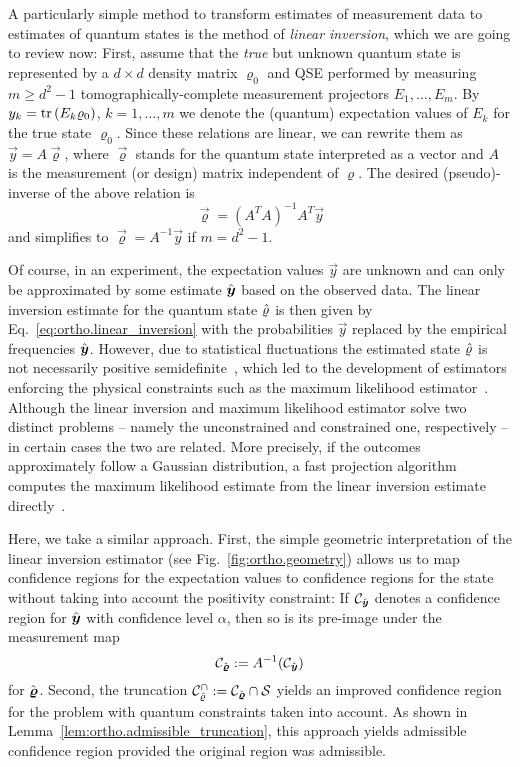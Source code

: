 A particularly simple method to transform estimates of measurement data to estimates of quantum states is the method of \emph{linear inversion}, which we are going to review now:
First, assume that the \emph{true} but unknown quantum state is represented by a $d\times d$ density matrix $\varrho_0$ and QSE performed by measuring $m\geq d^{2} - 1$ tomographically-complete measurement projectors $E_{1},\ldots,E_{m}$.
By $y_{k}=\operatorname{tr}\left(E_{k}\varrho_0\right)$, $k=1,\ldots,m$ we denote the (quantum) expectation values of $E_{k}$ for the true state $\varrho_0$.
Since these relations are linear, we can rewrite them as $\vec{y} = A \vec{\varrho}$, where $\vec{\varrho}$ stands for the quantum state interpreted as a vector and $A$ is the measurement (or design) matrix independent of $\varrho$.
The desired (pseudo)-inverse of the above relation is
\[
  \label{eq:ortho.linear_inversion}
  \vec{\varrho}={\left(A^{T}A\right)}^{-1}A^{T}\vec{y}
\]
and simplifies to $\vec{\varrho}=A^{-1}\vec{y}$ if $m=d^{2} - 1$.

Of course, in an experiment, the expectation values $\vec{y}$ are unknown and can only be approximated by some estimate $\hat{\boldsymbol{y}}$ based on the observed data.
The linear inversion estimate for the quantum state $\hat{\varrho}$ is then given by Eq.~\eqref{eq:ortho.linear_inversion} with the probabilities $\vec y$ replaced by the empirical frequencies $\hat{\boldsymbol{y}}$.
However, due to statistical fluctuations the estimated state $\hat{\varrho}$ is not necessarily positive semidefinite~\cite{Knips_2015_How}, which led to the development of estimators enforcing the physical constraints such as the maximum likelihood estimator~\cite{Hradil_2004_3}.
Although the linear inversion and maximum likelihood estimator solve two distinct problems -- namely the unconstrained and constrained one, respectively -- in certain cases the two are related.
 More precisely, if the outcomes approximately follow a Gaussian distribution, a fast projection algorithm computes the maximum likelihood estimate from the linear inversion estimate directly~\cite{Smolin_2012_Maximum}.

Here, we take a similar approach.
First, the simple geometric interpretation of the linear inversion estimator (see Fig.~\ref{fig:ortho.geometry}) allows us to map confidence regions for the expectation values to confidence regions for the state without taking into account the positivity constraint:
If $\mathcal{C}_{\hat{\boldsymbol{y}}}$ denotes a confidence region for $\hat{\boldsymbol{y}}$ with confidence level $\alpha$, then so is its pre-image under the measurement map
\[
  \label{eq:ortho.linear_confidence}
  \mathcal{C}_{\hat{\boldsymbol{\varrho}}} := A^{-1}(\mathcal{C}_{\hat{\boldsymbol{y}}})
\]
for $\hat{\boldsymbol{\varrho}}$.
Second, the truncation $\mathcal{C}^\cap_{\hat{\varrho}} := \mathcal{C}_{\hat{\boldsymbol{\varrho}}} \cap \mathcal{S}$ yields an improved confidence region for the problem with quantum constraints taken into account.
As shown in Lemma~\ref{lem:ortho.admissible_truncation}, this approach yields admissible confidence region provided the original region was admissible.

